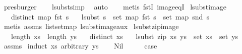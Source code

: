 \begin{isabellebody}
\ presburger\isanewline
\ \ \isamarkupfalse%
\ lsubst{\isacharunderscore}{\kern0pt}simp\ \isamarkupfalse%
\ auto\isanewline
\ \ \isamarkupfalse%
\ {\isacharparenleft}{\kern0pt}metis\ fstI\ image{\isacharunderscore}{\kern0pt}eqI{\isacharparenright}{\kern0pt}\isanewline
{}\isamarkupfalse%
%
\endisatagproof
{\isafoldproof}%
%
\isadelimproof
\isanewline
%
\endisadelimproof
\isanewline
\isanewline
{}\isamarkupfalse%
\ lsubst{\isacharunderscore}{\kern0pt}image{\isacharcolon}{\kern0pt}\isanewline
\ \ \ {\isachardoublequoteopen}distinct\ {\isacharparenleft}{\kern0pt}map\ fst\ s{\isacharparenright}{\kern0pt}{\isachardoublequoteclose}\isanewline
\ \ \ {\isachardoublequoteopen}lsubst\ s\ {\isacharbackquote}{\kern0pt}\ set\ {\isacharparenleft}{\kern0pt}map\ fst\ s{\isacharparenright}{\kern0pt}\ {\isacharequal}{\kern0pt}\ set\ {\isacharparenleft}{\kern0pt}map\ snd\ s{\isacharparenright}{\kern0pt}{\isachardoublequoteclose}\isanewline
%
\isadelimproof
%
\endisadelimproof
%
\isatagproof
{}\isamarkupfalse%
\ {\isacharparenleft}{\kern0pt}metis\ assms\ list{\isachardot}{\kern0pt}set{\isacharunderscore}{\kern0pt}map\ lsubst{\isacharunderscore}{\kern0pt}image{\isacharunderscore}{\kern0pt}aux{\isacharparenright}{\kern0pt}%
\endisatagproof
{\isafoldproof}%
%
\isadelimproof
\isanewline
%
\endisadelimproof
\isanewline
\isanewline
{}\isamarkupfalse%
\ lsubst{\isacharunderscore}{\kern0pt}zip{\isacharunderscore}{\kern0pt}image{\isacharcolon}{\kern0pt}\isanewline
\ \ \ {\isachardoublequoteopen}length\ xs\ {\isacharequal}{\kern0pt}\ length\ ys{\isachardoublequoteclose}\isanewline
\ \ \ {\isachardoublequoteopen}distinct\ xs{\isachardoublequoteclose}\isanewline
\ \ \ {\isachardoublequoteopen}lsubst\ {\isacharparenleft}{\kern0pt}zip\ xs\ ys{\isacharparenright}{\kern0pt}\ {\isacharbackquote}{\kern0pt}\ set\ xs\ {\isacharequal}{\kern0pt}\ set\ ys{\isachardoublequoteclose}\isanewline
%
\isadelimproof
%
\endisadelimproof
%
\isatagproof
{}\isamarkupfalse%
\ assms\isanewline
{}\isamarkupfalse%
\ {\isacharparenleft}{\kern0pt}induct\ xs\ arbitrary{\isacharcolon}{\kern0pt}\ ys{\isacharparenright}{\kern0pt}\isanewline
\ \ \isamarkupfalse%
\ Nil\isanewline
\ \ \isamarkupfalse%
\ \isamarkupfalse%
\ {\isacharquery}{\kern0pt}case\isanewline
\ \ \isamarkupfalse%

\end{isabellebody}
